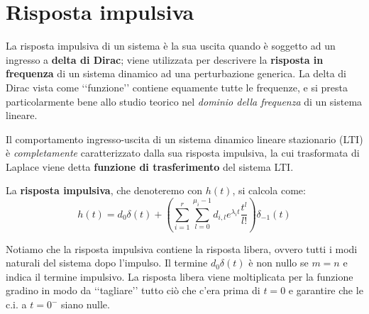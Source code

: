 \documentclass[a4paper, titlepage, oneside]{scrbook}
\begin{document}
\section{Risposta impulsiva}
La risposta impulsiva di un sistema è la sua uscita quando è soggetto ad un ingresso a \textbf{delta di Dirac};
viene utilizzata per descrivere la \textbf{risposta in frequenza} di un sistema dinamico ad una perturbazione generica.
La delta di Dirac vista come ‘‘funzione’’ contiene equamente tutte le frequenze, e si presta particolarmente bene allo studio teorico nel \textit{dominio della frequenza} di un sistema lineare.

Il comportamento ingresso-uscita di un sistema dinamico lineare stazionario (LTI) è \textit{completamente} caratterizzato dalla sua risposta impulsiva, la cui trasformata di Laplace viene detta \textbf{funzione di trasferimento} del sistema LTI.

La \textbf{risposta impulsiva}, che denoteremo con $h(t)$, si calcola come:
\begin{equation}
h(t)=d_0\delta(t)+\left(\sum_{i=1}^{r} \sum_{l=0}^{\mu_i-1} d_{i,l}e^{\lambda_it}\frac{t^l}{l!}\right)\delta_{-1}(t)
\label{eqn:risposta_impulsiva}
\end{equation}

Notiamo che la risposta impulsiva contiene la risposta libera, ovvero tutti i modi naturali del sistema dopo l'impulso. Il termine $d_0\delta(t)$ è non nullo se $m=n$ e indica il termine impulsivo.
La risposta libera viene moltiplicata per la funzione gradino in modo da ‘‘tagliare’’ tutto ciò che c'era prima di $t=0$ e garantire che le c.i. a $t=0^-$ siano nulle.
\end{document}
